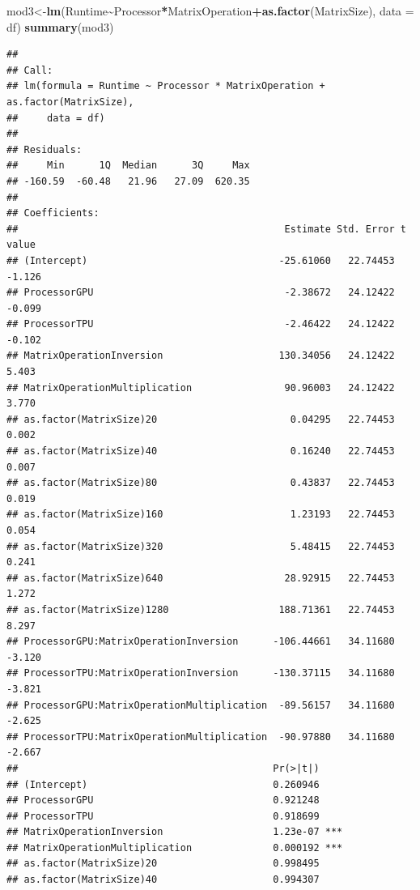\documentclass[
]{article}
\newenvironment{Shaded}{\begin{snugshade}}{\end{snugshade}}
\newcommand{\DataTypeTok}[1]{\textcolor[rgb]{0.13,0.29,0.53}{#1}}
\newcommand{\KeywordTok}[1]{\textcolor[rgb]{0.13,0.29,0.53}{\textbf{#1}}}
\newcommand{\NormalTok}[1]{#1}
\newcommand{\OperatorTok}[1]{\textcolor[rgb]{0.81,0.36,0.00}{\textbf{#1}}}
\begin{document}
\begin{Shaded}
\begin{Highlighting}[]
\NormalTok{mod3\textless{}{-}}\KeywordTok{lm}\NormalTok{(Runtime}\OperatorTok{\textasciitilde{}}\NormalTok{Processor}\OperatorTok{*}\NormalTok{MatrixOperation}\OperatorTok{+}\KeywordTok{as.factor}\NormalTok{(MatrixSize), }\DataTypeTok{data =}\NormalTok{ df)}
\KeywordTok{summary}\NormalTok{(mod3)}
\end{Highlighting}
\end{Shaded}

\begin{verbatim}
## 
## Call:
## lm(formula = Runtime ~ Processor * MatrixOperation + as.factor(MatrixSize), 
##     data = df)
## 
## Residuals:
##     Min      1Q  Median      3Q     Max 
## -160.59  -60.48   21.96   27.09  620.35 
## 
## Coefficients:
##                                              Estimate Std. Error t value
## (Intercept)                                 -25.61060   22.74453  -1.126
## ProcessorGPU                                 -2.38672   24.12422  -0.099
## ProcessorTPU                                 -2.46422   24.12422  -0.102
## MatrixOperationInversion                    130.34056   24.12422   5.403
## MatrixOperationMultiplication                90.96003   24.12422   3.770
## as.factor(MatrixSize)20                       0.04295   22.74453   0.002
## as.factor(MatrixSize)40                       0.16240   22.74453   0.007
## as.factor(MatrixSize)80                       0.43837   22.74453   0.019
## as.factor(MatrixSize)160                      1.23193   22.74453   0.054
## as.factor(MatrixSize)320                      5.48415   22.74453   0.241
## as.factor(MatrixSize)640                     28.92915   22.74453   1.272
## as.factor(MatrixSize)1280                   188.71361   22.74453   8.297
## ProcessorGPU:MatrixOperationInversion      -106.44661   34.11680  -3.120
## ProcessorTPU:MatrixOperationInversion      -130.37115   34.11680  -3.821
## ProcessorGPU:MatrixOperationMultiplication  -89.56157   34.11680  -2.625
## ProcessorTPU:MatrixOperationMultiplication  -90.97880   34.11680  -2.667
##                                            Pr(>|t|)    
## (Intercept)                                0.260946    
## ProcessorGPU                               0.921248    
## ProcessorTPU                               0.918699    
## MatrixOperationInversion                   1.23e-07 ***
## MatrixOperationMultiplication              0.000192 ***
## as.factor(MatrixSize)20                    0.998495    
## as.factor(MatrixSize)40                    0.994307    

\end{verbatim}
\end{document}
